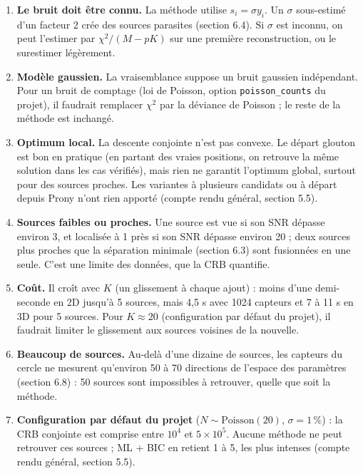 \documentclass[
  french,
]{article}
\providecommand{\tightlist}{%
  \setlength{\itemsep}{0pt}\setlength{\parskip}{0pt}}
\begin{document}
\begin{enumerate}
\def\labelenumi{\arabic{enumi}.}
\tightlist
\item
  \textbf{Le bruit doit être connu.} La méthode utilise
  \(s_i = \sigma y_i\). Un \(\sigma\) sous-estimé d'un facteur 2 crée
  des sources parasites (section 6.4). Si \(\sigma\) est inconnu, on
  peut l'estimer par \(\chi^2/(M - pK)\) sur une première
  reconstruction, ou le surestimer légèrement.
\item
  \textbf{Modèle gaussien.} La vraisemblance suppose un bruit gaussien
  indépendant. Pour un bruit de comptage (loi de Poisson, option
  \texttt{poisson\_counts} du projet), il faudrait remplacer \(\chi^2\)
  par la déviance de Poisson ; le reste de la méthode est inchangé.
\item
  \textbf{Optimum local.} La descente conjointe n'est pas convexe. Le
  départ glouton est bon en pratique (en partant des vraies positions,
  on retrouve la même solution dans les cas vérifiés), mais rien ne
  garantit l'optimum global, surtout pour des sources proches. Les
  variantes à plusieurs candidats ou à départ depuis Prony n'ont rien
  apporté (compte rendu général, section 5.5).
\item
  \textbf{Sources faibles ou proches.} Une source est vue si son SNR
  dépasse environ 3, et localisée à 1 près si son SNR dépasse environ 20
  ; deux sources plus proches que la séparation minimale (section 6.3)
  sont fusionnées en une seule. C'est une limite des données, que la CRB
  quantifie.
\item
  \textbf{Coût.} Il croît avec \(K\) (un glissement à chaque ajout) :
  moins d'une demi-seconde en 2D jusqu'à 5 sources, mais 4,5 s avec 1024
  capteurs et 7 à 11 s en 3D pour 5 sources. Pour \(K\approx 20\)
  (configuration par défaut du projet), il faudrait limiter le
  glissement aux sources voisines de la nouvelle.
\item
  \textbf{Beaucoup de sources.} Au-delà d'une dizaine de sources, les
  capteurs du cercle ne mesurent qu'environ 50 à 70 directions de
  l'espace des paramètres (section 6.8) : 50 sources sont impossibles à
  retrouver, quelle que soit la méthode.
\item
  \textbf{Configuration par défaut du projet}
  (\(N\sim\mathrm{Poisson}(20)\), \(\sigma = 1\,\%\)) : la CRB conjointe
  est comprise entre \(10^4\) et \(5\times 10^5\). Aucune méthode ne
  peut retrouver ces sources ; ML + BIC en retient 1 à 5, les plus
  intenses (compte rendu général, section 5.5).
\end{enumerate}
\end{document}
